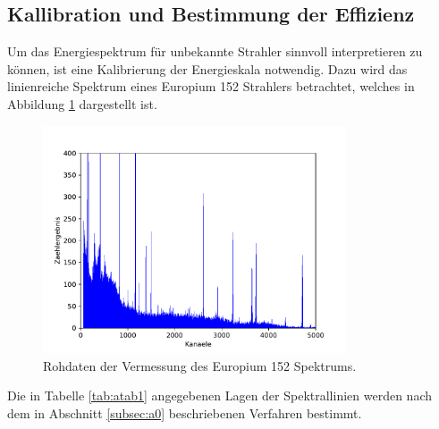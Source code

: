 \subsection{Kallibration und Bestimmung der Effizienz}
\label{subsec:a1}
Um das Energiespektrum für unbekannte Strahler sinnvoll interpretieren zu können,
ist eine Kalibrierung der Energieskala notwendig. Dazu wird das linienreiche Spektrum eines Europium 152 Strahlers betrachtet, welches in Abbildung \ref{fig:spektrum_eu} dargestellt ist.
\begin{figure}
 \centering
 \includegraphics[width=0.8\textwidth]{python/plots/spec1.pdf}
 \caption{Rohdaten der Vermessung des Europium 152 Spektrums.}
 \label{fig:spektrum_eu}
 \end{figure}
Die in Tabelle \ref{tab:atab1} angegebenen Lagen der Spektrallinien werden nach dem in Abschnitt \ref{subsec:a0} beschriebenen Verfahren bestimmt.
